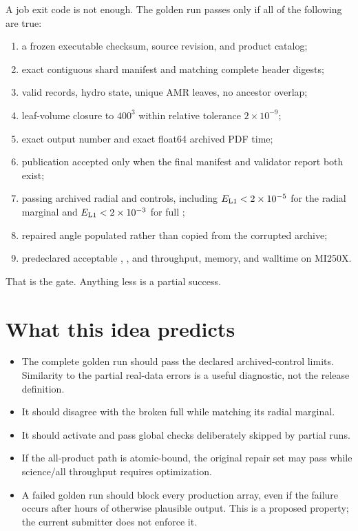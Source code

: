 \documentclass[11pt]{article}
\begin{document}
A job exit code is not enough. The golden run passes only if all of the
following are true:
\begin{enumerate}
  \item a frozen executable checksum, source revision, and product catalog;
  \item exact contiguous shard manifest and matching complete header digests;
  \item valid records, hydro state, unique AMR leaves, no ancestor overlap;
  \item leaf-volume closure to \(400^3\) within relative tolerance \(2\times10^{-9}\);
  \item exact output number and exact float64 archived PDF time;
  \item publication accepted only when the final manifest and validator report
        both exist;
  \item passing archived  radial and 
        controls, including \(E_{\rm L1}<2\times10^{-5}\) for the
         radial marginal and \(E_{\rm L1}<2\times10^{-3}\)
        for full ;
  \item repaired  angle populated rather than copied from the
        corrupted archive;
  \item predeclared acceptable , , and
         throughput, memory, and walltime on MI250X.
\end{enumerate}

That is the gate. Anything less is a partial success.

\section{What this idea predicts}

\begin{itemize}
  \item The complete golden run should pass the declared archived-control
        limits. Similarity to the partial real-data errors is a useful
        diagnostic, not the release definition.
  \item It should disagree with the broken full  while
        matching its radial marginal.
  \item It should activate and pass global checks deliberately skipped by
        partial runs.
  \item If the all-product path is atomic-bound, the original repair set may
        pass while science/all throughput requires optimization.
  \item A failed golden run should block every production array, even if the
        failure occurs after hours of otherwise plausible output. This is a
        proposed property; the current submitter does not enforce it.
\end{itemize}
\end{document}

